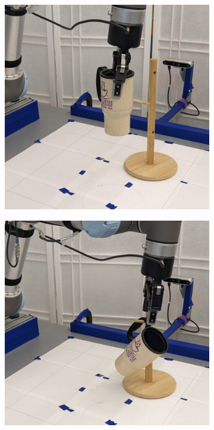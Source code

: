 \documentclass{article}
\begin{document}
\begin{figure}[]
\begin{subfigure}{(\linewidth - 0.05\linewidth)/5}
    \end{subfigure}
    \begin{subfigure}{(\linewidth - 0.05\linewidth)/5}
        \centering
        \includegraphics[width=\linewidth]{figures/episodes/mug_on_tree_zoom/8.jpg}
    \end{subfigure}
    \begin{subfigure}{(\linewidth - 0.05\linewidth)/5}
        \centering
        \includegraphics[width=\linewidth]{figures/episodes/mug_on_tree_zoom/9.jpg}

\end{subfigure}
\end{figure}
\end{document}
